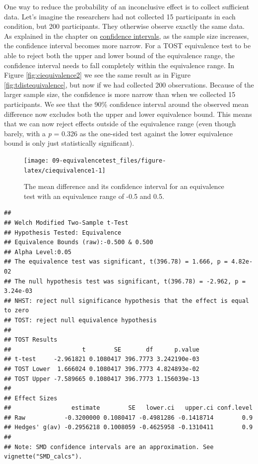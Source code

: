\documentclass[
  oneside]{book}
\begin{document}
One way to reduce the probability of an inconclusive effect is to collect sufficient data. Let's imagine the researchers had not collected 15 participants in each condition, but 200 participants. They otherwise observe exactly the same data. As explained in the chapter on \protect\hyperlink{confint}{confidence intervals}, as the sample size increases, the confidence interval becomes more narrow. For a TOST equivalence test to be able to reject both the upper and lower bound of the equivalence range, the confidence interval needs to fall completely within the equivalence range. In Figure \ref{fig:ciequivalence2} we see the same result as in Figure \ref{fig:tdistequivalence}, but now if we had collected 200 observations. Because of the larger sample size, the confidence is more narrow than when we collected 15 participants. We see that the 90\% confidence interval around the observed mean difference now excludes both the upper and lower equivalence bound. This means that we can now reject effects outside of the equivalence range (even though barely, with a \emph{p} = 0.326 as the one-sided test against the lower equivalence bound is only just statistically significant).

\begin{figure}

{\centering \texttt{[image: 09-equivalencetest\_files/figure-latex/ciequivalence1-1]} 

}

\caption{The mean difference and its confidence interval for an equivalence test with an equivalence range of -0.5 and 0.5.}\label{fig:ciequivalence1}
\end{figure}

\begin{verbatim}
## 
## Welch Modified Two-Sample t-Test
## Hypothesis Tested: Equivalence
## Equivalence Bounds (raw):-0.500 & 0.500
## Alpha Level:0.05
## The equivalence test was significant, t(396.78) = 1.666, p = 4.82e-02
## The null hypothesis test was significant, t(396.78) = -2.962, p = 3.24e-03
## NHST: reject null significance hypothesis that the effect is equal to zero 
## TOST: reject null equivalence hypothesis
## 
## TOST Results 
##                    t        SE       df      p.value
## t-test     -2.961821 0.1080417 396.7773 3.242190e-03
## TOST Lower  1.666024 0.1080417 396.7773 4.824893e-02
## TOST Upper -7.589665 0.1080417 396.7773 1.156039e-13
## 
## Effect Sizes 
##                 estimate        SE   lower.ci   upper.ci conf.level
## Raw           -0.3200000 0.1080417 -0.4981286 -0.1418714        0.9
## Hedges' g(av) -0.2956218 0.1008059 -0.4625958 -0.1310411        0.9
## 
## Note: SMD confidence intervals are an approximation. See vignette("SMD_calcs").
\end{verbatim}
\end{document}
